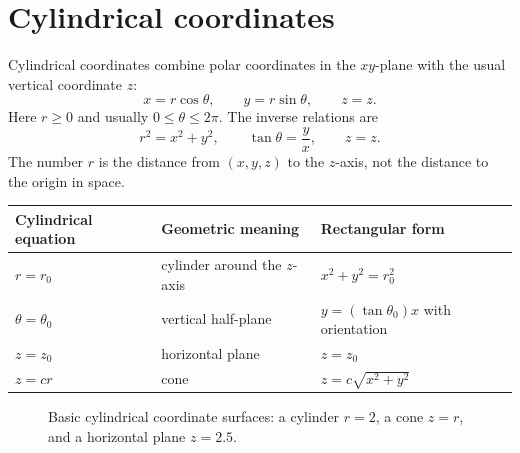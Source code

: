 \documentclass[11pt,oneside]{book}
\begin{document}
\section{Cylindrical coordinates}

\begin{definitionbox}
Cylindrical coordinates combine polar coordinates in the $xy$-plane with the usual vertical coordinate $z$:
\[
x=r\cos\theta,\qquad y=r\sin\theta,\qquad z=z.
\]
Here $r\ge 0$ and usually $0\le \theta\le 2\pi$. The inverse relations are
\[
r^2=x^2+y^2,\qquad \tan\theta=\frac{y}{x},\qquad z=z.
\]
The number $r$ is the distance from $(x,y,z)$ to the $z$-axis, not the distance to the origin in space.
\end{definitionbox}

\begin{center}
\begin{tabular}{lll}
\toprule
Cylindrical equation & Geometric meaning & Rectangular form \\
\midrule
$r=r_0$ & cylinder around the $z$-axis & $x^2+y^2=r_0^2$ \\
$\theta=\theta_0$ & vertical half-plane & $y=(\tan\theta_0)x$ with orientation \\
$z=z_0$ & horizontal plane & $z=z_0$ \\
$z=cr$ & cone & $z=c\sqrt{x^2+y^2}$ \\
\bottomrule
\end{tabular}
\end{center}

\begin{figure}[H]
\centering
{}
\caption{Basic cylindrical coordinate surfaces: a cylinder $r=2$, a cone $z=r$, and a horizontal plane $z=2.5$.}
\end{figure}
\end{document}
